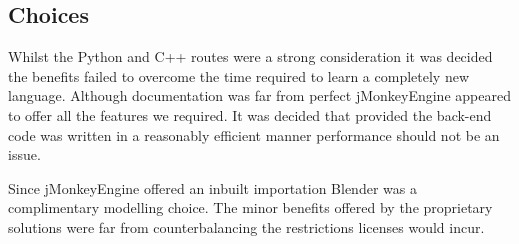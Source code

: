 \subsection{Choices}

Whilst the Python and C++ routes were a strong consideration it was
decided the benefits failed to overcome the time required to learn
a completely new language. Although documentation was far from perfect
jMonkeyEngine appeared to offer all the features we required. It was decided
that provided the back-end code was written in a reasonably efficient
manner performance should not be an issue.

Since jMonkeyEngine offered an inbuilt importation Blender was a complimentary
modelling choice. The minor benefits offered by the proprietary solutions
were far from counterbalancing the restrictions licenses would incur.

